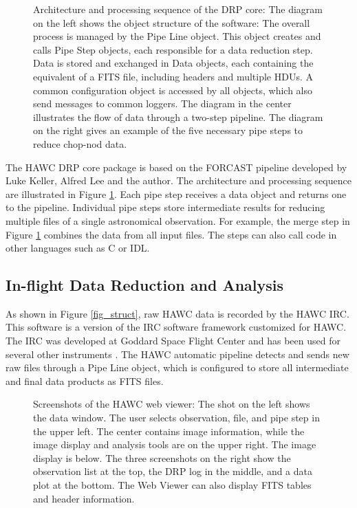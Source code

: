\begin{figure}[!ht]
\begin{minipage}{\textwidth}
\end{minipage}

\caption{Architecture and processing sequence of the DRP core: The
  diagram on the left shows the object structure of the software: The
  overall process is managed by the Pipe Line object. This object
  creates and calls Pipe Step objects, each responsible for a data
  reduction step. Data is stored and exchanged in Data objects, each
  containing the equivalent of a FITS file, including headers and
  multiple HDUs. A common configuration object is accessed by all
  objects, which also send messages to common loggers. The diagram in
  the center illustrates the flow of data through a two-step
  pipeline. The diagram on the right gives an example of the five
  necessary pipe steps to reduce chop-nod data.}

\label{fig_core}
\end{figure}

The HAWC DRP core package is
based on the FORCAST pipeline developed by Luke Keller, Alfred Lee
and the author.
The architecture and processing sequence are
illustrated in Figure \ref{fig_core}. Each pipe step receives a data
object and returns one to the pipeline. Individual pipe steps store
intermediate results for reducing multiple files of a single
astronomical observation. For example, the merge step in Figure
\ref{fig_core} combines the data from all input files. The steps can
also call code in other languages such as C or IDL.

\subsection{In-flight Data Reduction and Analysis}

As shown in Figure \ref{fig_struct}, raw HAWC data is recorded by the
HAWC IRC. This software is a version of the IRC software framework
customized for HAWC. The IRC was developed at Goddard Space Flight
Center and has been used for several other instruments
\citep[see][]{staguhn06}. The HAWC automatic pipeline detects and
sends new raw files through a Pipe Line object, which is configured
to store all intermediate and final data products as FITS files.

\begin{figure}[!ht]

\caption{Screenshots of the HAWC web viewer: The shot on the left
  shows the data window. The user selects observation, file, and pipe
  step in the upper left. The center contains image information, while
  the image display and analysis tools are on the upper right. The
  image display is below. The three screenshots on the right show the
  observation list at the top, the DRP log in the middle, and a data
  plot at the bottom. The Web Viewer can also display FITS tables and
  header information.}

\label{fig_screen}

\end{figure}

